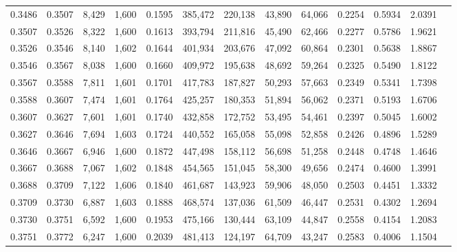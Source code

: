 \begin{tabular}{rrrrrrrrrrrrr}
0.3486 & 0.3507 &  8,429 & 1,600 &                                     0.1595 & 385,472 & 220,138 &  43,890 &  64,066 & 0.2254 & 0.5934 & 2.0391 \\
0.3507 & 0.3526 &  8,322 & 1,600 &                                     0.1613 & 393,794 & 211,816 &  45,490 &  62,466 & 0.2277 & 0.5786 & 1.9621 \\
0.3526 & 0.3546 &  8,140 & 1,602 &                                     0.1644 & 401,934 & 203,676 &  47,092 &  60,864 & 0.2301 & 0.5638 & 1.8867 \\
0.3546 & 0.3567 &  8,038 & 1,600 &                                     0.1660 & 409,972 & 195,638 &  48,692 &  59,264 & 0.2325 & 0.5490 & 1.8122 \\
0.3567 & 0.3588 &  7,811 & 1,601 &                                     0.1701 & 417,783 & 187,827 &  50,293 &  57,663 & 0.2349 & 0.5341 & 1.7398 \\
0.3588 & 0.3607 &  7,474 & 1,601 &                                     0.1764 & 425,257 & 180,353 &  51,894 &  56,062 & 0.2371 & 0.5193 & 1.6706 \\
0.3607 & 0.3627 &  7,601 & 1,601 &                                     0.1740 & 432,858 & 172,752 &  53,495 &  54,461 & 0.2397 & 0.5045 & 1.6002 \\
0.3627 & 0.3646 &  7,694 & 1,603 &                                     0.1724 & 440,552 & 165,058 &  55,098 &  52,858 & 0.2426 & 0.4896 & 1.5289 \\
0.3646 & 0.3667 &  6,946 & 1,600 &                                     0.1872 & 447,498 & 158,112 &  56,698 &  51,258 & 0.2448 & 0.4748 & 1.4646 \\
0.3667 & 0.3688 &  7,067 & 1,602 &                                     0.1848 & 454,565 & 151,045 &  58,300 &  49,656 & 0.2474 & 0.4600 & 1.3991 \\
0.3688 & 0.3709 &  7,122 & 1,606 &                                     0.1840 & 461,687 & 143,923 &  59,906 &  48,050 & 0.2503 & 0.4451 & 1.3332 \\
0.3709 & 0.3730 &  6,887 & 1,603 &                                     0.1888 & 468,574 & 137,036 &  61,509 &  46,447 & 0.2531 & 0.4302 & 1.2694 \\
0.3730 & 0.3751 &  6,592 & 1,600 &                                     0.1953 & 475,166 & 130,444 &  63,109 &  44,847 & 0.2558 & 0.4154 & 1.2083 \\
0.3751 & 0.3772 &  6,247 & 1,600 &                                     0.2039 & 481,413 & 124,197 &  64,709 &  43,247 & 0.2583 & 0.4006 & 1.1504 \\

\end{tabular}

